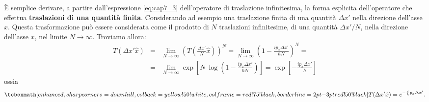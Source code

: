 È semplice derivare, a partire dall'espressione \eqref{eq:cap7_3} dell'operatore di traslazione infinitesima, la forma esplicita dell'operatore che effettua \textbf{traslazioni di una quantità finita}. Considerando ad esempio una traslazione finita di una quantità $\Delta x '$ nella direzione dell'asse $x$. Questa trasformazione può essere considerata come il prodotto di $N$ traslazioni infinitesime, di una quantità $\Delta x ' / N$, nella direzione dell'asse $x$, nel limite $N\rightarrow \infty $. Troviamo allora:
	\begin{eqnarray}
	T(\Delta x'\hat{x}) & = & \lim _{N\rightarrow \infty} \left(T \left( \frac{\Delta x'}{N}\hat{x} \right) \right) ^N = \lim _{N\rightarrow \infty} \left( 1- \frac{i p_x \Delta x'}{\hbar N} \right) ^N =\nonumber \\
	&=& \lim _{N\rightarrow \infty} \exp \left[N\ \log \left(1- \frac{i p_x \Delta x'}{\hbar N}  \right) \right] =   \exp \left[  -\frac{i p_x \Delta x'}{\hbar}  \right] 
	\end{eqnarray}
ossia
	\begin{equation}
		\tcboxmath[enhanced,sharp corners=downhill ,colback=yellow!50!white,colframe=red!75!black, borderline={2pt}{-3pt}{red!50!black}]{	
			T(\Delta x'\hat{x}) = e^{-\frac{i}{\hbar} p_x \Delta x' }.
			}
	\end{equation}
